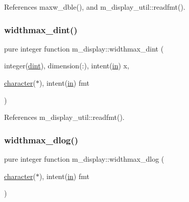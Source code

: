 References maxw\+\_\+dble(), and m\+\_\+display\+\_\+util\+::readfmt().

\mbox{\label{namespacem__display_a8310ed88204e0715b21b2afb0a6d12ac}} 
\subsubsection{\texorpdfstring{widthmax\+\_\+dint()}{widthmax\_dint()}}
{\footnotesize\ttfamily pure integer function m\+\_\+display\+::widthmax\+\_\+dint (\begin{DoxyParamCaption}\item[{integer(\hyperlink{namespacem__display_a73f772e9702cad6f40b78364fde2c7cd}{dint}), dimension(\+:), intent(\hyperlink{M__journal_83_8txt_afce72651d1eed785a2132bee863b2f38}{in})}]{x,  }\item[{\hyperlink{option__stopwatch_83_8txt_abd4b21fbbd175834027b5224bfe97e66}{character}($\ast$), intent(\hyperlink{M__journal_83_8txt_afce72651d1eed785a2132bee863b2f38}{in})}]{fmt }\end{DoxyParamCaption})\hspace{0.3cm}{\ttfamily [private]}}



References m\+\_\+display\+\_\+util\+::readfmt().

\mbox{\label{namespacem__display_ac342ada170e8066fa938cf8eb69f09bb}} 
\subsubsection{\texorpdfstring{widthmax\+\_\+dlog()}{widthmax\_dlog()}}
{\footnotesize\ttfamily pure integer function m\+\_\+display\+::widthmax\+\_\+dlog (\begin{DoxyParamCaption}\item[{\hyperlink{option__stopwatch_83_8txt_abd4b21fbbd175834027b5224bfe97e66}{character}($\ast$), intent(\hyperlink{M__journal_83_8txt_afce72651d1eed785a2132bee863b2f38}{in})}]{fmt }\end{DoxyParamCaption})\hspace{0.3cm}{\ttfamily [private]}}



